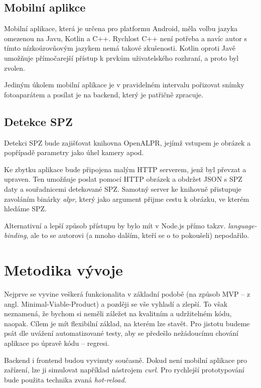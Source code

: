 \subsection{Mobilní aplikce} \label{mobile_app}

\noindent
Mobilní aplikace, která je určena pro platformu Android, měla volbu jazyka omezenou na Javu, Kotlin a C++.
Rychlost C++ není potřeba a navíc autor s tímto nízkoúrovňovým jazykem nemá takové zkušenosti.
Kotlin oproti Javě umožňuje přímočarejší přístup k prvkům uživatelského rozhraní, a proto byl zvolen.

Jediným úkolem mobilní aplikace je v pravidelném intervalu pořizovat snímky fotoaparátem a posílat je na
backend, který je patřičně zpracuje.

\subsection{Detekce SPZ}

\noindent
Detekci SPZ bude zajišťovat knihovna OpenALPR, jejímž vstupem je obrázek a popřípadě
parametry jako úhel kamery apod.
\citep[][]{OpenALPR}

Ke zbytku aplikace bude připojena malým HTTP serverem, jenž byl převzat a upraven.
Ten umožňuje poslat pomocí HTTP obrázek a obdržet JSON s SPZ daty a souřadnicemi detekované SPZ.
Samotný server ke knihovně přistupuje zavoláním binárky \textit{alpr}, který jako argument přijme cestu k
obrázku, ve kterém hledáme SPZ. \citep[][]{OpenALPR_Server}

Alternativní a lepší způsob přístupu by bylo mít v Node.js přímo takzv.
\textit{language-binding}, ale to se autorovi (a mnoho dalším, kteří se o to pokoušeli) nepodařilo.

\section{Metodika vývoje}

\noindent
Nejprve se vyvine veškerá funkcionalita v základní podobě
(na způsob MVP -- z angl. Minimal-Viable-Product) a později se vše vyhladí a zlepší. To však neznamená,
že bychom si neměli záležet na kvalitním a udržitelném kódu, naopak. Cílem je mít flexibilní základ,
na kterém lze stavět. Pro jistotu budeme psát dle uvážení automatizované testy, aby se předešlo
nežádoucímu chování aplikace po úpravě kódu -- regresi.

Backend i frontend budou vyvinuty současně. Dokud není mobilní aplikace pro zařízení, lze ji simulovat
například nástrojem \textit{curl}. Pro rychlejší prototypování bude použita technika zvaná
\textit{hot-reload}.
